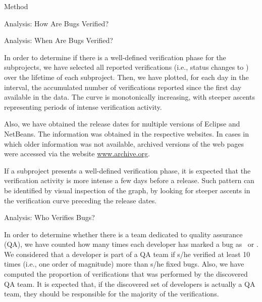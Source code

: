 \begin{section}{Method}
\begin{subsection}{Analysis: How Are Bugs Verified?}
\end{subsection}

\begin{subsection}{Analysis: When Are Bugs Verified?}
	
	In order to determine if there is a well-defined verification phase for the subprojects, we have selected all reported verifications (i.e., status changes to \VERIFIED) over the lifetime of each subproject. Then, we have plotted, for each day in the interval, the accumulated number of verifications reported since the first day available in the data. The curve is monotonically increasing, with steeper ascents representing periods of intense verification activity.
	
	Also, we have obtained the release dates for multiple versions of Eclipse and NetBeans. The information was obtained in the respective websites. In cases in which older information was not available, archived versions of the web pages were accessed via the website \url{www.archive.org}.
	
	If a subproject presents a well-defined verification phase, it is expected that the verification activity is more intense a few days before a release. Such pattern can be identified by visual inspection of the graph, by looking for steeper ascents in the verification curve preceding the release dates.
	
\end{subsection}

\begin{subsection}{Analysis: Who Verifies Bugs?}
	
	In order to determine whether there is a team dedicated to quality assurance (QA), we have counted how many times each developer has marked a bug as \FIXED\ or \VERIFIED. We considered that a developer is part of a QA team if s/he verified at least 10 times (i.e., one order of magnitude) more than s/he fixed bugs. Also, we have computed the proportion of verifications that was performed by the discovered QA team. It is expected that, if the discovered set of developers is actually a QA team, they should be responsible for the majority of the verifications.
	
\end{subsection}

\end{section}

